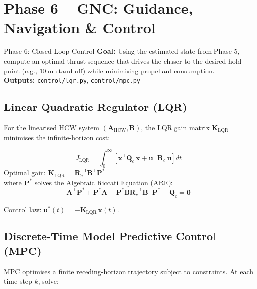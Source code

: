 \documentclass[12pt, a4paper]{article}
\newcommand{\vx}{\mathbf{x}}
\newcommand{\vcu}{\mathbf{u}}
\newcommand{\mA}{\mathbf{A}}
\newcommand{\mB}{\mathbf{B}}
\newcommand{\mK}{\mathbf{K}}
\newcommand{\HCW}{\mathrm{HCW}}
\begin{document}
\section{Phase 6 -- GNC: Guidance, Navigation \& Control}

\begin{phasebox}{Phase 6: Closed-Loop Control}
\textbf{Goal:} Using the estimated state from Phase 5, compute an
optimal thrust sequence that drives the chaser to the desired hold-point
(e.g., $10\ \mathrm{m}$ stand-off) while minimising propellant consumption.\\[0.5em]
\textbf{Outputs:} \texttt{control/lqr.py}, \texttt{control/mpc.py}
\end{phasebox}

\subsection{Linear Quadratic Regulator (LQR)}

For the linearised HCW system $(\mA_{\HCW}, \mB)$, the LQR gain matrix
$\mK_{\mathrm{LQR}}$ minimises the infinite-horizon cost:

\begin{formulabox}[title=LQR Cost Function]
\begin{equation}
J_{\mathrm{LQR}} = \int_0^\infty
\left[\vx^\top \mathbf{Q}_c\, \vx + \vcu^\top \mathbf{R}_c\, \vcu\right] dt
\end{equation}
Optimal gain: $\mK_{\mathrm{LQR}} = \mathbf{R}_c^{-1} \mB^\top \mathbf{P}^*$\\
where $\mathbf{P}^*$ solves the Algebraic Riccati Equation (ARE):
\begin{equation}
\mA^\top \mathbf{P}^* + \mathbf{P}^* \mA
- \mathbf{P}^* \mB \mathbf{R}_c^{-1} \mB^\top \mathbf{P}^* + \mathbf{Q}_c = \mathbf{0}
\end{equation}
\end{formulabox}

Control law: $\vcu^*(t) = -\mK_{\mathrm{LQR}}\, \vx(t)$.

\subsection{Discrete-Time Model Predictive Control (MPC)}

MPC optimises a finite receding-horizon trajectory subject to constraints.
At each time step $k$, solve:
\end{document}
